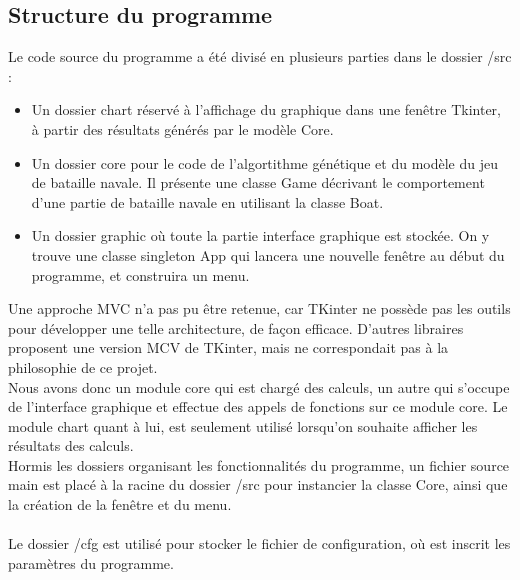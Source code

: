 \documentclass[12pt]{report}
\begin{document}
	\subsection{Structure du programme}
	Le code source du programme a été divisé en plusieurs parties dans le dossier /src :
	\begin{itemize}
		\item Un dossier chart réservé à l'affichage du graphique dans une fenêtre Tkinter, à partir des résultats générés par le modèle Core.
		\item Un dossier core pour le code de l'algortithme génétique et du modèle du jeu de bataille navale. Il présente une classe Game décrivant le comportement d'une partie de bataille navale en utilisant la classe Boat.
		\item Un dossier graphic où toute la partie interface graphique est stockée. On y trouve une classe singleton App qui lancera une nouvelle fenêtre au début du programme, et construira un menu.
	\end{itemize}
	Une approche MVC n'a pas pu être retenue, car TKinter ne possède pas les outils pour développer une telle architecture, de façon efficace. D'autres libraires proposent une version MCV de TKinter, mais ne correspondait pas à la philosophie de ce projet.\\
	Nous avons donc un module core qui est chargé des calculs, un autre qui s'occupe de l'interface graphique et effectue des appels de fonctions sur ce module core. Le module chart quant à lui, est seulement utilisé lorsqu'on souhaite afficher les résultats des calculs.\\
	Hormis les dossiers organisant les fonctionnalités du programme, un fichier source main est placé à la racine du dossier /src pour instancier la classe Core, ainsi que la création de la fenêtre et du menu.\\\\
	Le dossier /cfg est utilisé pour stocker le fichier de configuration, où est inscrit les paramètres du programme.\\
	\newpage
\end{document}
